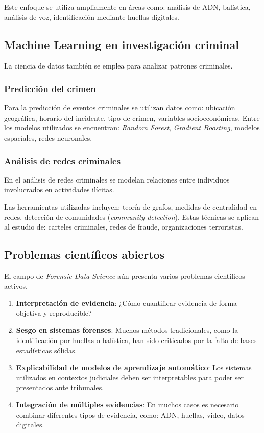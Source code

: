 \documentclass[a4paper,10pt,oneside]{article}
\begin{document}
Este enfoque se utiliza ampliamente en \'areas como: an\'alisis de ADN, bal\'istica, an\'alisis de voz, identificaci\'on mediante huellas digitales.


\subsection{Machine Learning en investigaci\'on criminal}

La ciencia de datos tambi\'en se emplea para analizar patrones criminales.

\subsubsection*{Predicci\'on del crimen}

Para la predicci\'on de eventos criminales se utilizan datos como: ubicaci\'on geogr\'afica, horario del incidente, tipo de crimen, variables socioecon\'omicas. Entre los modelos utilizados se encuentran:  \textit{Random Forest}, \textit{Gradient Boosting}, modelos espaciales, redes neuronales.


\subsubsection*{An\'alisis de redes criminales}

En el an\'alisis de redes criminales se modelan relaciones entre individuos involucrados en actividades il\'icitas.

Las herramientas utilizadas incluyen:  teor\'ia de grafos, medidas de centralidad en redes, detecci\'on de comunidades (\textit{community detection}). Estas t\'ecnicas se aplican al estudio de: carteles criminales, redes de fraude, organizaciones terroristas.

\subsection{Problemas cient\'ificos abiertos}

El campo de \textit{Forensic Data Science} a\'un presenta varios problemas cient\'ificos activos.

\begin{enumerate}
\item \textbf{Interpretaci\'on de evidencia}: ¿C\'omo cuantificar evidencia de forma objetiva y reproducible?

\item \textbf{Sesgo en sistemas forenses}: Muchos m\'etodos tradicionales, como la identificaci\'on por huellas o bal\'istica, han sido criticados por la falta de bases estad\'isticas s\'olidas.

\item \textbf{Explicabilidad de modelos de aprendizaje autom\'atico}: Los sistemas utilizados en contextos judiciales deben ser interpretables para poder ser presentados ante tribunales.

\item \textbf{Integraci\'on de m\'ultiples evidencias}: En muchos casos es necesario combinar diferentes tipos de evidencia, como:  ADN, huellas, video, datos digitales.

\end{enumerate}
\end{document}
